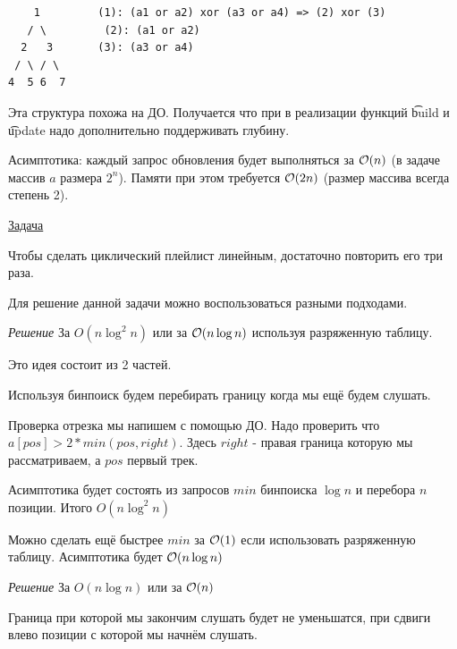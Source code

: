 \begin{verbatim}
    1         (1): (a1 or a2) xor (a3 or a4) => (2) xor (3)
   / \	       (2): (a1 or a2) 
  2   3       (3): (a3 or a4)
 / \ / \
4  5 6  7      
\end{verbatim}

Эта структура похожа на ДО. Получается что при в реализации функций \t{build} и \t{update} надо дополнительно поддерживать глубину.

Асимптотика: каждый запрос обновления будет выполняться за $\mathcal{O}(n)$ (в задаче массив $a$ размера $2^n$). Памяти при этом требуется $\mathcal{O}(2n)$ (размер массива всегда степень 2).


\href{https://codeforces.com/problemset/problem/1237/D}{Задача}

Чтобы сделать циклический плейлист линейным, достаточно повторить его три раза.

Для решение данной задачи можно воспользоваться разными подходами. 

{\it Решение } За $O(n \log^2 n)$ или за $\mathcal{O}(n \log n)$ используя разряженную таблицу.

Это идея состоит из 2 частей.
\up \up
\begin{MyList}[0pt]
	\item Используя бинпоиск будем перебирать границу когда мы ещё будем слушать.
	\item Проверка отрезка мы напишем с помощью ДО. Надо проверить что $a[pos] > 2 * min(pos, right)$. Здесь $right$ - правая граница которую мы рассматриваем, а $pos$ первый трек.
\end{MyList}

Асимптотика будет состоять из запросов $min$ бинпоиска $\log n$ и перебора $n$ позиции. Итого $O(n \log^2 n)$ \down

Можно сделать ещё быстрее $min$ за $\mathcal{O}(1)$ если использовать разряженную таблицу. Асимптотика будет $\mathcal{O}(n \log n)$ \href{https://codeforces.com/contest/1237/submission/62698504}{} \href{https://codeforces.com/contest/1237/submission/63401681}{}

\down

{\it Решение } За $O(n \log n)$ или за $\mathcal{O}(n)$ \href{https://codeforces.com/contest/1237/submission/62704110}{}

\begin{Prop}Граница при которой мы закончим слушать будет не уменьшатся, при сдвиги влево позиции с которой мы начнём слушать.\end{Prop}

